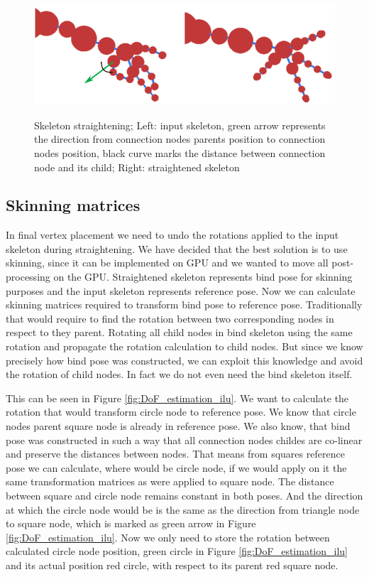 \begin{figure}[h]
    \centering
    \includegraphics[width=\textwidth]{images/straightening2.png}
    \label{fig:straightening_ilu}
    \caption[Skeleton straightening]{Skeleton straightening; Left: input skeleton, green arrow represents the direction from connection nodes parents position to connection nodes position, black curve marks the distance between connection node and its child; Right: straightened skeleton}
\end{figure}

\subsection{Skinning matrices}
In final vertex placement we need to undo the rotations applied to the input skeleton during straightening. We have decided that the best solution is to use skinning, since it can be implemented on GPU and we wanted to move all post-processing on the GPU. Straightened skeleton represents bind pose for skinning purposes and the input skeleton represents reference pose. Now we can calculate skinning matrices required to transform bind pose to reference pose. Traditionally that would require to find the rotation between two corresponding nodes in respect to they parent. Rotating all child nodes in bind skeleton using the same rotation and propagate the rotation calculation to child nodes. But since we know precisely how bind pose was constructed, we can exploit this knowledge and avoid the rotation of child nodes. In fact we do not even need the bind skeleton itself.

This can be seen in Figure \ref{fig:DoF_estimation_ilu}. We want to calculate the rotation that would transform circle node to reference pose. We know that circle nodes parent square node is already in reference pose. We also know, that bind pose was constructed in such a way that all connection nodes childes are co-linear and preserve the distances between nodes. That means from squares reference pose we can calculate, where would be circle node, if we would apply on it the same transformation matrices as were applied to square node. The distance between square and circle node remains constant in both poses. And the direction at which the circle node would be is the same as the direction from triangle node to square node, which is marked as green arrow in Figure \ref{fig:DoF_estimation_ilu}. Now we only need to store the rotation between calculated circle node position, green circle in Figure \ref{fig:DoF_estimation_ilu} and its actual position red circle, with respect to its parent red square node.

